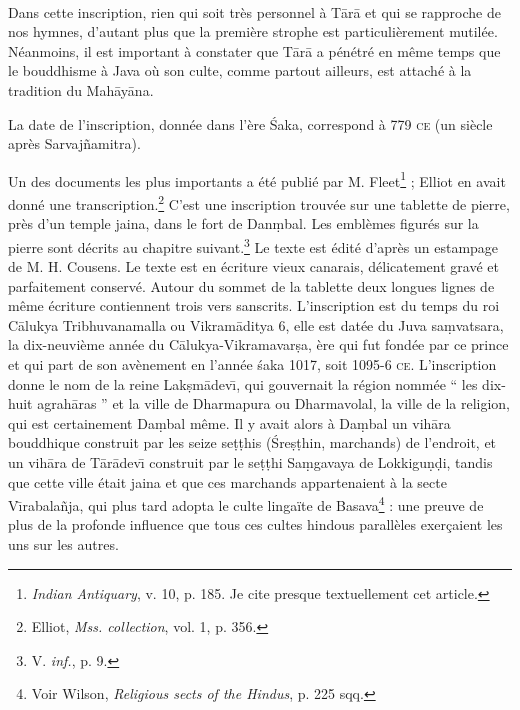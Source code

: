 \documentclass[a4paper, 11pt, oneside, french]{article}
\begin{document}
\paragraph{}
Dans cette inscription, rien qui soit très personnel à T\={a}r\={a} et qui se rapproche de nos hymnes, d'autant plus que la première strophe est particulièrement mutilée. Néanmoins, il est important à constater que T\={a}r\={a} a pénétré en même temps que le bouddhisme à Java où son culte, comme partout ailleurs, est attaché à la tradition du Mah\={a}y\={a}na.

La date de l'inscription, donnée dans l'ère \'{S}aka, correspond à 779 \textsc{ce} (un siècle après Sarvaj\~{n}amitra).

Un des documents les plus importants a été publié par M. Fleet\footnote{\emph{Indian Antiquary}, v. 10, p. 185. Je cite presque textuellement cet article.} ; Elliot en avait donné une transcription.\footnote{Elliot, \emph{Mss. collection}, vol. 1, p. 356.} C'est une inscription trouvée sur une tablette de pierre, près d'un temple jaina, dans le fort de Dan\d{m}bal. Les emblèmes figurés sur la pierre sont décrits au chapitre suivant.\footnote{V. \emph{inf.}, p. 9.} Le texte est édité d'après un estampage de M. H. Cousens. Le texte est en écriture vieux canarais, délicatement gravé et parfaitement conservé. Autour du sommet de la tablette deux longues lignes de même écriture contiennent trois vers sanscrits. L'inscription est du temps du roi C\={a}lukya Tribhuvanamalla ou Vikram\={a}ditya 6, elle est datée du Juva sa\d{m}vatsara, la dix-neuvième année du C\={a}lukya-Vikramavar\d{s}a, ère qui fut fondée par ce prince et qui part de son avènement en l'année \'{s}aka 1017, soit 1095-6 \textsc{ce}. L'inscription donne le nom de la reine Lak\d{s}m\={a}dev\={\i}, qui gouvernait la région nommée `` les dix-huit agrah\={a}ras '' et la ville de Dharmapura ou Dharmavolal, la ville de la religion, qui est certainement Da\d{m}bal même. Il y avait alors à Da\d{m}bal un vih\={a}ra bouddhique construit par les seize se\d{t}\d{t}his (\'{S}re\d{s}\d{t}hin, marchands) de l'endroit, et un vih\={a}ra de T\={a}r\={a}dev\={\i} construit par le se\d{t}\d{t}hi Sa\d{m}gavaya de Lokkigu\d{n}\d{d}i, tandis que cette ville était jaina et que ces marchands appartenaient à la secte V\={\i}rabala\~{n}ja, qui plus tard adopta le culte lingaïte de Basava\footnote{Voir Wilson, \emph{Religious sects of the Hindus}, p. 225 sqq.} : une preuve de plus de la profonde influence que tous ces cultes hindous parallèles exerçaient les uns sur les autres.
\end{document}
